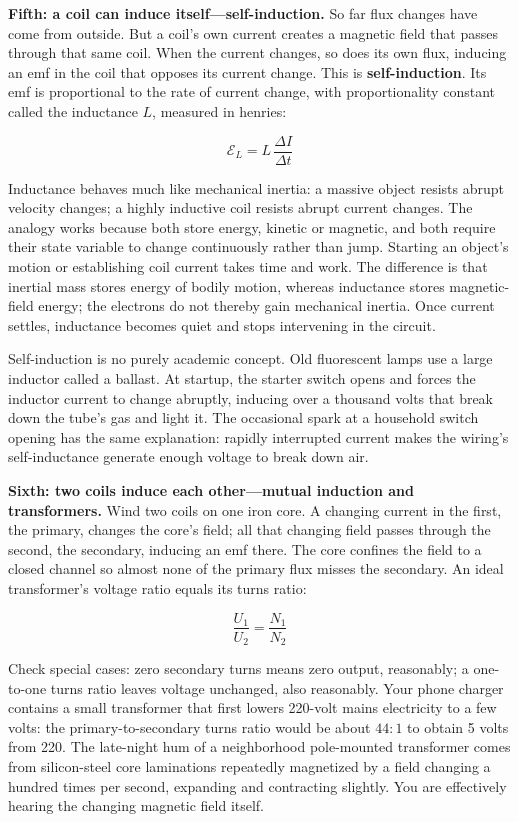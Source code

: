 \textbf{Fifth: a coil can induce itself---self-induction.} So far flux changes have come from outside. But a coil's own current creates a magnetic field that passes through that same coil. When the current changes, so does its own flux, inducing an emf in the coil that opposes its current change. This is \textbf{self-induction}. Its emf is proportional to the rate of current change, with proportionality constant called the inductance \(L\), measured in henries:

\[
\mathcal{E}_{L} = L\,\frac{\Delta I}{\Delta t}
\]

Inductance behaves much like mechanical inertia: a massive object resists abrupt velocity changes; a highly inductive coil resists abrupt current changes. The analogy works because both store energy, kinetic or magnetic, and both require their state variable to change continuously rather than jump. Starting an object's motion or establishing coil current takes time and work. The difference is that inertial mass stores energy of bodily motion, whereas inductance stores magnetic-field energy; the electrons do not thereby gain mechanical inertia. Once current settles, inductance becomes quiet and stops intervening in the circuit.

Self-induction is no purely academic concept. Old fluorescent lamps use a large inductor called a ballast. At startup, the starter switch opens and forces the inductor current to change abruptly, inducing over a thousand volts that break down the tube's gas and light it. The occasional spark at a household switch opening has the same explanation: rapidly interrupted current makes the wiring's self-inductance generate enough voltage to break down air.

\textbf{Sixth: two coils induce each other---mutual induction and transformers.} Wind two coils on one iron core. A changing current in the first, the primary, changes the core's field; all that changing field passes through the second, the secondary, inducing an emf there. The core confines the field to a closed channel so almost none of the primary flux misses the secondary. An ideal transformer's voltage ratio equals its turns ratio:

\[
\frac{U_1}{U_2}=\frac{N_1}{N_2}
\]

Check special cases: zero secondary turns means zero output, reasonably; a one-to-one turns ratio leaves voltage unchanged, also reasonably. Your phone charger contains a small transformer that first lowers 220-volt mains electricity to a few volts: the primary-to-secondary turns ratio would be about \(44:1\) to obtain 5 volts from 220. The late-night hum of a neighborhood pole-mounted transformer comes from silicon-steel core laminations repeatedly magnetized by a field changing a hundred times per second, expanding and contracting slightly. You are effectively hearing the changing magnetic field itself.

